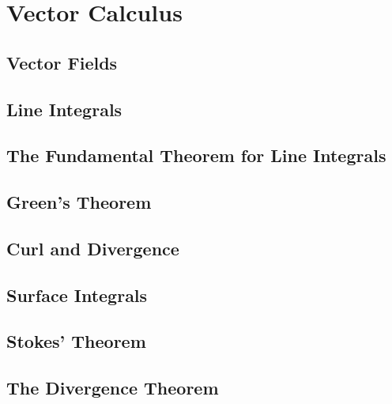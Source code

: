 \documentclass[../calc3.tex]{subfiles}
\begin{document}
\chapter{Vector Calculus}
\section{Vector Fields}

\section{Line Integrals}

\section{The Fundamental Theorem for Line Integrals}

\section{Green's Theorem}

\section{Curl and Divergence}

\section{Surface Integrals}

\section{Stokes' Theorem}

\section{The Divergence Theorem}
\end{document}
